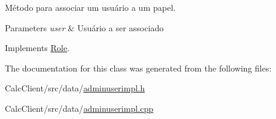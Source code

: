 Método para associar um usuário a um papel. 


\begin{DoxyParams}{Parameters}
{\em user} & Usuário a ser associado \\
\hline
\end{DoxyParams}


Implements \hyperlink{classRole_ab5581d91192fa578070e80b0247dde5a}{Role}.



The documentation for this class was generated from the following files\+:\begin{DoxyCompactItemize}
\item 
Calc\+Client/src/data/\hyperlink{adminuserimpl_8h}{adminuserimpl.\+h}\item 
Calc\+Client/src/data/\hyperlink{adminuserimpl_8cpp}{adminuserimpl.\+cpp}\end{DoxyCompactItemize}
